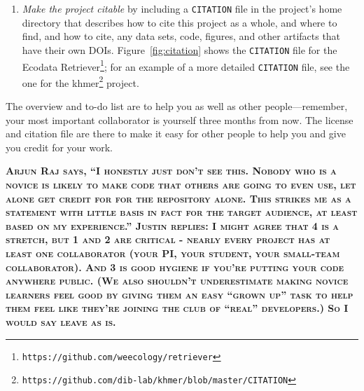 \documentclass[10pt]{article}
\newcommand{\fixme}[1]{\textsc{\textbf{#1}}}
\newcommand{\recommend}[1]{\textit{#1}}
\newcommand{\withurl}[2]{{#1}\footnote{\texttt{#2}}}
\begin{document}
\begin{enumerate}
  \begin{framed}
    \noindent \textbf{What Not To Do}

    We recommend \emph{against} the ``no commercial use'' variations of
    the Creative Commons licenses because they may impede some forms of
    re-use.  For example, if a researcher in a developing country is being
    paid by her government to compile a public health report, and wishes
    to include some of your data, she will be unable to do so if the
    license says ``non-commercial''. We recommend permissive software
    licenses rather than the \withurl{GNU General Public
      License}{https://www.safaribooksonline.com/library/view/understanding-open-source/0596005814/ch03.html}
    (GPL) because it is easier to integrate permissively-licensed software
    into other projects. (Note that it is straightforward to switch from a
    permissive license to the GPL if you should change your mind later but
    rather more complicated to go in the other direction.)
  \end{framed}

\item    
  \recommend{Make the project citable} by including a
  \texttt{CITATION} file in the project's home directory that
  describes how to cite this project as a whole, and where to find,
  and how to cite, any data sets, code, figures, and other artifacts
  that have their own DOIs.  Figure~\ref{fig:citation} shows the
  \texttt{CITATION} file for the \withurl{Ecodata
    Retriever}{https://github.com/weecology/retriever}; for an example
  of a more detailed \texttt{CITATION} file, see the one for the
  \withurl{khmer}{https://github.com/dib-lab/khmer/blob/master/CITATION}
  project.

\end{enumerate}

The overview and to-do list are to help you as well as other
people---remember, your most important collaborator is yourself three
months from now. The license and citation file are there to make it
easy for other people to help you and give you credit for your work.

\fixme{Arjun Raj says, ``I honestly just don't see this. Nobody who is
  a novice is likely to make code that others are going to even use,
  let alone get credit for for the repository alone. This strikes me
  as a statement with little basis in fact for the target audience, at
  least based on my experience.'' Justin replies: I might agree that 4 is a stretch, but 1 and 2 are critical - nearly every project has at least one collaborator (your PI, your student, your small-team collaborator). And 3 is good hygiene if you're putting your code anywhere public. (We also shouldn't underestimate making novice learners feel good by giving them an easy ``grown up'' task to help them feel like they're joining the club of ``real'' developers.) So I would say leave as is.}
\end{document}
